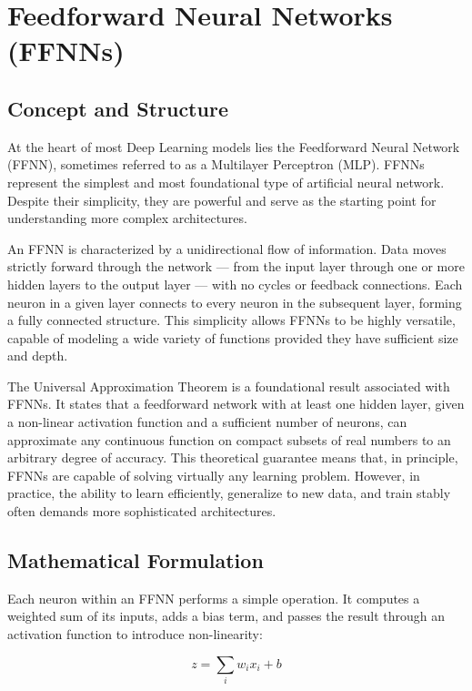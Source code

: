 \documentclass[openany]{book}
\begin{document}
\section{Feedforward Neural Networks (FFNNs)}

\subsection{Concept and Structure}

At the heart of most Deep Learning models lies the Feedforward Neural Network 
(FFNN), sometimes referred to as a Multilayer Perceptron (MLP). FFNNs represent 
the simplest and most foundational type of artificial neural network. Despite 
their simplicity, they are powerful and serve as the starting point for 
understanding more complex architectures.

An FFNN is characterized by a unidirectional flow of information. Data moves 
strictly forward through the network — from the input layer through one or more 
hidden layers to the output layer — with no cycles or feedback connections. Each 
neuron in a given layer connects to every neuron in the subsequent layer, 
forming a fully connected structure. This simplicity allows FFNNs to be highly 
versatile, capable of modeling a wide variety of functions provided they have 
sufficient size and depth.

The Universal Approximation Theorem is a foundational result associated with 
FFNNs. It states that a feedforward network with at least one hidden layer, 
given a non-linear activation function and a sufficient number of neurons, can 
approximate any continuous function on compact subsets of real numbers to an 
arbitrary degree of accuracy. This theoretical guarantee means that, in 
principle, FFNNs are capable of solving virtually any learning problem. However, 
in practice, the ability to learn efficiently, generalize to new data, and train 
stably often demands more sophisticated architectures.

\subsection{Mathematical Formulation}

Each neuron within an FFNN performs a simple operation. It computes a weighted 
sum of its inputs, adds a bias term, and passes the result through an activation 
function to introduce non-linearity:

\begin{equation}
z = \sum_{i} w_i x_i + b
\end{equation}
\end{document}
